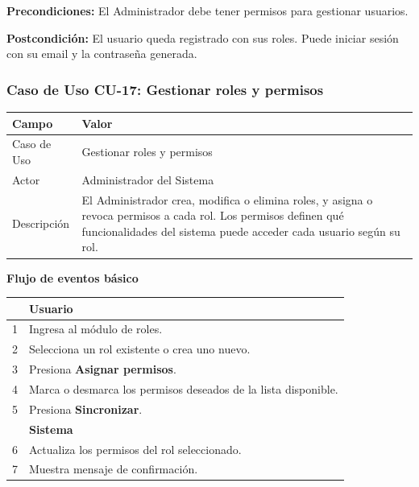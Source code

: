\documentclass[stu]{apa7}
\begin{document}
\vspace{0.3cm}

\textbf{Precondiciones:} El Administrador debe tener permisos para gestionar usuarios.

\textbf{Postcondición:} El usuario queda registrado con sus roles. Puede iniciar sesión con su email y la contraseña generada.

\newpage

\subsubsection{Caso de Uso CU-17: Gestionar roles y permisos}

\begin{tabularx}{\textwidth}{|l|X|}
\hline
\rowcolor[gray]{0.9}
\textbf{Campo} & \textbf{Valor} \\
\hline
Caso de Uso & Gestionar roles y permisos \\
\hline
Actor & Administrador del Sistema \\
\hline
Descripción & El Administrador crea, modifica o elimina roles, y asigna o revoca permisos a cada rol. Los permisos definen qué funcionalidades del sistema puede acceder cada usuario según su rol. \\
\hline
\end{tabularx}

\vspace{0.3cm}

\textbf{Flujo de eventos básico}

\begin{tabularx}{\textwidth}{|c|X|}
\hline
& \textbf{Usuario} \\
\hline
1 & Ingresa al módulo de roles. \\
\hline
2 & Selecciona un rol existente o crea uno nuevo. \\
\hline
3 & Presiona \textbf{Asignar permisos}. \\
\hline
4 & Marca o desmarca los permisos deseados de la lista disponible. \\
\hline
5 & Presiona \textbf{Sincronizar}. \\
\hline
& \textbf{Sistema} \\
\hline
6 & Actualiza los permisos del rol seleccionado. \\
\hline
7 & Muestra mensaje de confirmación. \\
\hline
\end{tabularx}

\vspace{0.3cm}
\end{document}
